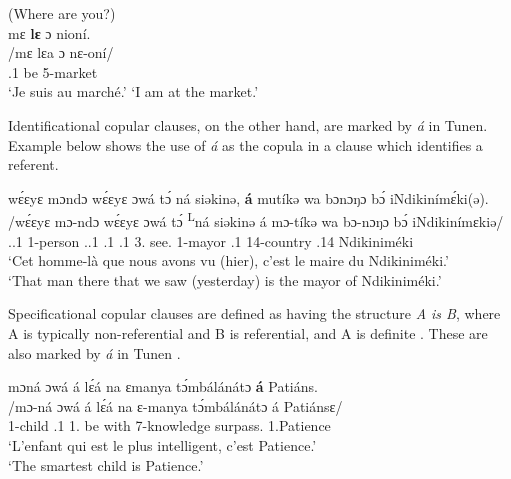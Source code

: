 \documentclass[output=paper,colorlinks,citecolor=brown
]{langscibook}
\begin{document}
\ex
\label{copatmarket}
(Where are you?) \\
\glll 
{\db}mɛ \textbf{lɛ}	ɔ	nioní. \\
/mɛ lɛa ɔ nɛ-oní/ \\
{\db}\SM{}.1\SG{} be \PREP{} 5-market \\
\glt
`Je suis au marché.' \quad `I am at the market.' \jambox*{[PM 102]}

  
 \z\largerpage[2]

Identificational copular clauses, on the other hand, are marked by \textit{á} \COP{} in Tunen. Example  below shows the use of \textit{á} as the copula in a clause which identifies a referent.

\ea
\label{identificationalcop1}
\glll
{\db}wɛ́ɛyɛ mɔndɔ wɛ́ɛyɛ ɔwá tɔ́ \ds{}ná siəkinə, \textbf{á} mutíkə wa bɔnɔŋɔ bɔ́ iNdikinímɛ́ki(ə). \\
/wɛ́ɛyɛ mɔ-ndɔ wɛ́ɛyɛ ɔwá tɔ́ \textsuperscript{L}ná  siəkinə á mɔ-tíkə wa bɔ-nɔŋɔ bɔ́ iNdikinímɛkiə/ \\
{\db}\DEM{}.\DISC{}.1{} 1-person \DEM{}.\DISC{}.1{} \REL{}.1{} \SM{}.1\PL{} \PST{}3.\REL{} see.\DUR{} \COP{} 1-mayor \ASS{}.1{} 14-country \ASS{}.14{} Ndikiniméki \\
\glt
‘Cet homme-là que nous avons vu (hier), c’est le maire du Ndikiniméki.' \\ `That man there that we saw (yesterday) is the mayor of Ndikiniméki.' \jambox*{[PM 780] }

  
 \z

Specificational copular clauses are defined as having the structure \textit{A is B}, where A is typically non-referential and B is referential, and A is definite \citep{Heycock2012}. These are also marked by \textit{á} \COP{} in Tunen .

\ea
\label{specificationalcop1}
\glll
{\db}mɔná	ɔwá	á lɛ́á	na ɛmanya tɔ́mbálánátɔ	\textbf{á} Patiáns.\\
/mɔ-ná	ɔwá	á lɛ́á	na	ɛ-manya tɔ́mbálánátɔ	á	Patiánsɛ/\\
{\db}1-child	\REL{}.1{}	1\SM{}.\REL{} be	with	7-knowledge surpass.\PTCP{}	\COP{}	1.Patience\\
\glt
`L’enfant qui est le plus intelligent, c’est Patience.’ \\ `The smartest child is Patience.' \jambox*{[JO 854] }
  
\end{document}
